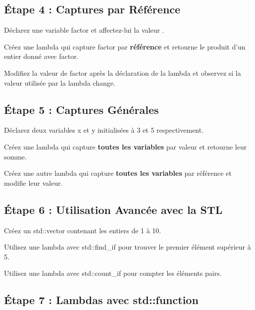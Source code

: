 \subsection*{Étape 4 \+: Captures par Référence}


\begin{DoxyEnumerate}
\item Déclarez une variable {\ttfamily factor} et affectez-\/lui la valeur {}.
\item Créez une lambda qui capture {\ttfamily factor} par {\bfseries référence} et retourne le produit d’un entier donné avec {\ttfamily factor}.
\item Modifiez la valeur de {\ttfamily factor} après la déclaration de la lambda et observez si la valeur utilisée par la lambda change.
\end{DoxyEnumerate}

\subsection*{Étape 5 \+: Captures Générales}


\begin{DoxyEnumerate}
\item Déclarez deux variables {\ttfamily x} et {\ttfamily y} initialisées à 3 et 5 respectivement.
\item Créez une lambda qui capture {\bfseries toutes les variables} par valeur et retourne leur somme.
\item Créez une autre lambda qui capture {\bfseries toutes les variables} par référence et modifie leur valeur.
\end{DoxyEnumerate}

\subsection*{Étape 6 \+: Utilisation Avancée avec la S\+TL}


\begin{DoxyEnumerate}
\item Créez un {\ttfamily std\+::vector} contenant les entiers de 1 à 10.
\item Utilisez une lambda avec {\ttfamily std\+::find\+\_\+if} pour trouver le premier élément supérieur à 5.
\item Utilisez une lambda avec {\ttfamily std\+::count\+\_\+if} pour compter les éléments pairs.
\end{DoxyEnumerate}

\subsection*{Étape 7 \+: Lambdas avec {\ttfamily std\+::function}}



